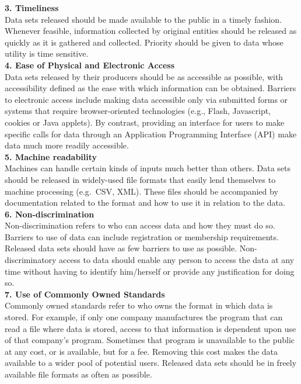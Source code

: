 \documentclass[graybox,natbib,nospthms,UStrade]{svmono}
\begin{document}
\textbf{3. Timeliness}\\
Data sets released should be made available to the public in a timely
fashion. Whenever feasible, information collected by original entities
should be released as quickly as it is gathered and collected. Priority
should be given to data whose utility is time sensitive.\\

\textbf{4. Ease of Physical and Electronic Access}\\
Data sets released by their producers should be as accessible as
possible, with accessibility defined as the ease with which information
can be obtained. Barriers to electronic access include making data
accessible only via submitted forms or systems that require
browser-oriented technologies (e.g., Flash, Javascript, cookies or Java
applets). By contrast, providing an interface for users to make specific
calls for data through an Application Programming Interface (API) make
data much more readily accessible.\\

\textbf{5. Machine readability}\\
Machines can handle certain kinds of inputs much better than others.
Data sets should be released in widely-used file formats that easily lend
themselves to machine processing (e.g.~CSV, XML). These files should be
accompanied by documentation related to the format and how to use it in
relation to the data.\\

\textbf{6. Non-discrimination}\\
Non-discrimination refers to who can access data and how they must do
so. Barriers to use of data can include registration or membership
requirements. Released data sets should have as few barriers to use as
possible. Non-discriminatory access to data should enable any person to
access the data at any time without having to identify him/herself or
provide any justification for doing so.\\

\textbf{7. Use of Commonly Owned Standards}\\
Commonly owned standards refer to who owns the format in which data is
stored. For example, if only one company manufactures the program that
can read a file where data is stored, access to that information is
dependent upon use of that company's program. Sometimes that program is
unavailable to the public at any cost, or is available, but for a fee.
Removing this cost makes the data available to a wider pool of potential
users. Released data sets should be in freely available file formats as
often as possible.\\
\end{document}
